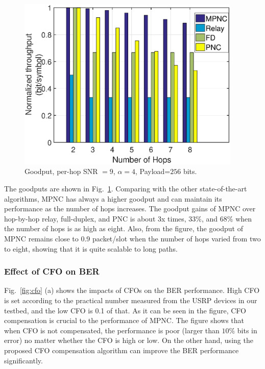 \begin{figure}
    \centering
    \includegraphics[width=0.95\textwidth]{figures/sim_th_alpha4_snrh2h9BL256}
    \caption{Goodput, per-hop SNR $=9$, $\alpha=4$, Payload=$256$ bits.}
    \label{fig:throughput}
\end{figure}
The goodputs  are shown in Fig.~\ref{fig:throughput}. Comparing with the other state-of-the-art algorithms, MPNC has always a higher goodput and can maintain its performance as the number of hops increases. The goodput gains of MPNC over hop-by-hop relay, full-duplex, and PNC is about 3x times, $33\%$, and $68\%$ when the number of hops is as high as eight. Also, from the figure, the goodput of MPNC remains close to 0.9 packet/slot when the number of hops varied from two to eight, showing that it is quite scalable to long paths. 



\subsubsection{Effect of CFO on BER} %
\label{sub:effect_cfo_on_ber}
Fig.~\ref{fig:cfo} (a) shows the impacts of CFOs on the BER performance.
 High CFO is set according to the practical number measured from the USRP devices in our testbed, and the low CFO is 0.1 of that. As it can be seen in the figure, CFO compensation is crucial to the performance of MPNC. The figure shows that when CFO is not compensated, the performance is poor (larger than $10\%$ bits in error) no matter whether the CFO is high or low. On the other hand, using the proposed CFO compensation algorithm can improve the BER performance significantly.

